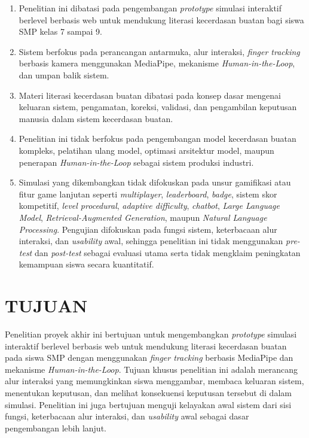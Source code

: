 \documentclass[12pt,a4paper,oneside,openany]{report}
\begin{document}
\begin{enumerate}
    \item Penelitian ini dibatasi pada pengembangan \textit{prototype} simulasi interaktif berlevel berbasis web untuk mendukung literasi kecerdasan buatan bagi siswa SMP kelas 7 sampai 9.
    \item Sistem berfokus pada perancangan antarmuka, alur interaksi, \textit{finger tracking} berbasis kamera menggunakan MediaPipe, mekanisme \textit{Human-in-the-Loop}, dan umpan balik sistem.
    \item Materi literasi kecerdasan buatan dibatasi pada konsep dasar mengenai keluaran sistem, pengamatan, koreksi, validasi, dan pengambilan keputusan manusia dalam sistem kecerdasan buatan.
    \item Penelitian ini tidak berfokus pada pengembangan model kecerdasan buatan kompleks, pelatihan ulang model, optimasi arsitektur model, maupun penerapan \textit{Human-in-the-Loop} sebagai sistem produksi industri.
    \item Simulasi yang dikembangkan tidak difokuskan pada unsur gamifikasi atau fitur game lanjutan seperti \textit{multiplayer}, \textit{leaderboard}, \textit{badge}, sistem skor kompetitif, \textit{level procedural}, \textit{adaptive difficulty}, \textit{chatbot}, \textit{Large Language Model}, \textit{Retrieval-Augmented Generation}, maupun \textit{Natural Language Processing}. Pengujian difokuskan pada fungsi sistem, keterbacaan alur interaksi, dan \textit{usability} awal, sehingga penelitian ini tidak menggunakan \textit{pre-test} dan \textit{post-test} sebagai evaluasi utama serta tidak mengklaim peningkatan kemampuan siswa secara kuantitatif.
\end{enumerate}

\section{TUJUAN}
\label{sec:tujuan}

Penelitian proyek akhir ini bertujuan untuk mengembangkan \textit{prototype} simulasi interaktif berlevel berbasis web untuk mendukung literasi kecerdasan buatan pada siswa SMP dengan menggunakan \textit{finger tracking} berbasis MediaPipe dan mekanisme \textit{Human-in-the-Loop}. Tujuan khusus penelitian ini adalah merancang alur interaksi yang memungkinkan siswa menggambar, membaca keluaran sistem, menentukan keputusan, dan melihat konsekuensi keputusan tersebut di dalam simulasi. Penelitian ini juga bertujuan menguji kelayakan awal sistem dari sisi fungsi, keterbacaan alur interaksi, dan \textit{usability} awal sebagai dasar pengembangan lebih lanjut.
\end{document}
